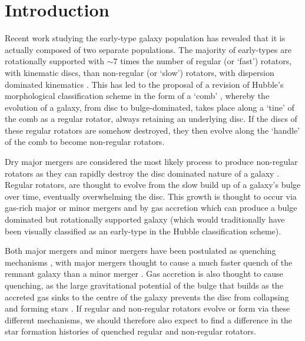 \documentclass[useAMS,usenatbib]{mn2e}
\begin{document}
\section{Introduction}\label{sec:intro}

Recent work studying the early-type galaxy population has revealed that it is actually composed of two separate populations. The majority of early-types are rotationally supported \citep{emsellem11} with $\sim7$ times the number of regular (or `fast') rotators, with kinematic discs, than non-regular (or `slow') rotators, with dispersion dominated kinematics \citep{cappellari07, emsellem07}.  This has led to the proposal of a revision of Hubble's morphological classification scheme in the form of a `comb' \citep{cappellari16}, whereby the evolution of a galaxy, from  disc to bulge-dominated, takes place along a `tine' of the comb as a regular rotator, always retaining an underlying disc. If the discs of these regular rotators are somehow destroyed, they then evolve along the `handle' of the comb to become non-regular rotators. 

Dry major mergers are considered the most likely process to produce non-regular rotators \citep{duc11, naab14} as they can rapidly destroy the disc dominated nature of a galaxy \citep{toomre72}. %
Regular rotators, are thought to evolve from the slow build up of a galaxy's bulge over time, eventually overwhelming the disc. This growth is thought to occur via gas-rich major or minor mergers \citep{duc11} and by gas accretion \citep{cappellari13, johnston14} which can produce a bulge dominated but rotationally supported galaxy (which would traditionally have been visually classified as an early-type in the Hubble classification scheme). %

Both major mergers and minor mergers have been postulated as quenching mechanisms \citep{hopkins08a, snyder11, hayward14}, with major mergers thought to cause a much faster quench of the remnant galaxy than a minor merger \citep{lotz08b, lotz11}. Gas accretion is also thought to cause quenching, as the large gravitational potential of the bulge that builds as the accreted gas sinks to the centre of the galaxy prevents the disc from collapsing and forming stars \citep{fang13}. If regular and non-regular rotators evolve or form via these different mechanisms, we should therefore also expect to find a difference in the star formation histories of quenched regular and non-regular rotators. 
\end{document}
